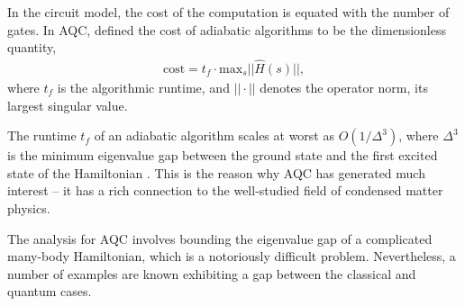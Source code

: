 In the circuit model, the cost of the computation is equated with the number of gates. In AQC, \cite{???} defined the cost of adiabatic algorithms to be the dimensionless quantity,
\begin{align}
\mathrm{cost} = t_f \cdot \mathrm{max}_s ||\hat{H}(s)||,
\end{align}
where $t_f$ is the algorithmic runtime, and $||\cdot||$ denotes the operator norm, its largest singular value.

The runtime $t_f$ of an adiabatic algorithm scales at worst as \mbox{$O(1/\Delta^3)$}, where $\Delta^3$ is the minimum eigenvalue gap between the ground state and the first excited state of the Hamiltonian \cite{???}. This is the reason why AQC has generated much interest -- it has a rich connection to the well-studied field of condensed matter physics.

The analysis for AQC involves bounding the eigenvalue gap of a complicated many-body Hamiltonian, which is a notoriously difficult problem. Nevertheless, a number of examples are known exhibiting a gap between the classical and quantum cases. 

